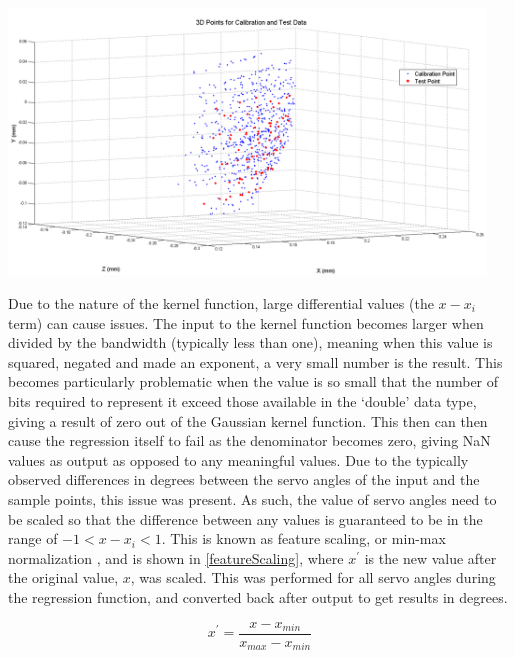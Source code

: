 \documentclass[11pt]{article}
\begin{document}
\begin{center}
\includegraphics[width=0.95\textwidth]{images/calibrationTestPoints.png}
\label{figure:calibrationTestPoints}
\end{center}



Due to the nature of the kernel function, large differential values (the $x - x_{i}$ term) can cause issues. The input to the kernel function becomes larger when divided by the bandwidth (typically less than one), meaning when this value is squared, negated and made an exponent, a very small number is the result. This becomes particularly problematic when the value is so small that the number of bits required to represent it exceed those available in the `double' data type, giving a result of zero out of the Gaussian kernel function. This then can then cause the regression itself to fail as the denominator becomes zero, giving NaN values as output as opposed to any meaningful values. Due to the typically observed differences in degrees between the servo angles of the input and the sample points, this issue was present. As such, the value of servo angles need to be scaled so that the difference between any values is guaranteed to be in the range of $-1 < x - x_{i} < 1$. This is known as feature scaling, or min-max normalization \cite{mohamad2013}, and is shown in \eqref{featureScaling}, where $x^{\prime}$ is the new value after the original value, $x$, was scaled. This was performed for all servo angles during the regression function, and converted back after output to get results in degrees.

\begin{equation}\label{featureScaling}
x^{\prime} = \frac{x - x_{min}}{x_{max} - x_{min}}
\end{equation}
\end{document}

